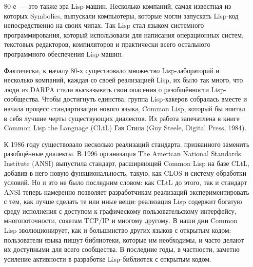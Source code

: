 80-е~--- это также эра Lisp-машин. Несколько компаний, самая известная из которых
Symbolics, выпускали компьютеры, которые могли запускать Lisp-код непосредственно на своих
чипах. Так Lisp стал языком системного программирования, который использовали для
написания операционных систем, текстовых редакторов, компиляторов и практически всего
остального программного обеспечения Lisp-ма\-шин.

Фактически, к началу 80-х существовало множество Lisp-ла\-бо\-ра\-то\-рий и несколько компаний,
каждая со своей реализацией Lisp, их было так много, что люди из DARPA стали высказывать
свои опасения о разобщённости Lisp-со\-об\-щест\-ва. Чтобы достигнуть единства, группа
Lisp-ха\-ке\-ров собралась вместе и начала процесс стандартизации нового языка, Common Lisp,
который бы впитал в себя лучшие черты существующих диалектов. Их работа запечатлена в
книге Common Lisp the Language (CLtL) Гая Стила (Guy Steele, Digital Press, 1984).

К 1986 году существовало несколько реализаций стандарта, призванного заменить разобщённые
диалекты. В 1996 организация The American National Standards Institute (ANSI) выпустила
стандарт, расширяющий Common Lisp на базе CLtL, добавив в него новую функциональность,
такую, как CLOS и систему обработки условий. Но и это не было последним словом: как CLtL
до этого, так и стандарт ANSI теперь намеренно позволяет разработчикам реализаций
экспериментировать с тем, как лучше сделать те или иные вещи: реализация Lisp содержит
богатую среду исполнения с доступом к графическому пользовательскому интерфейсу,
многопоточности, сокетам TCP/IP и многому другому. В наши дни Common Lisp эволюционирует,
как и большинство других языков с открытым кодом: пользователи языка пишут
библиотеки, которые им необходимы, и часто делают их доступными для всего сообщества. В
последние годы, в частности, заметно усиление активности в разработке Lisp-би\-бли\-о\-тек 
с открытым кодом.

